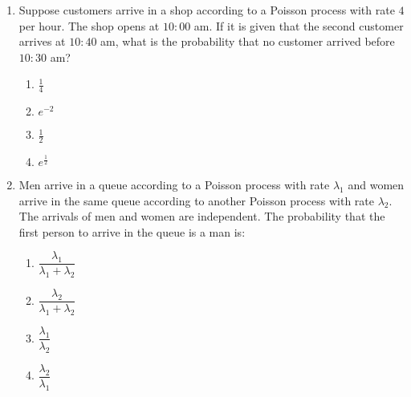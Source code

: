 \begin{enumerate}[label=\thesection.\arabic*.,ref=\thesection.\theenumi]
%
\item Suppose customers arrive in a shop according to a Poisson process with rate $4$ per hour. The shop opens at $10:00$ am. If it is given that the second customer arrives at $10:40 $ am, what is the probability that no customer arrived before $10:30 $ am? 
%
    \begin{enumerate}
        \item $\frac{1}{4}$
        \item $e^{-2}$
        \item $\frac{1}{2}$
        \item $e^{\frac{1}{2}}$
    \end{enumerate}
%
%
\solution

%
\item Men arrive in a queue according to a Poisson process with rate $\lambda_1$ and women arrive in the same queue according to another Poisson process with rate $\lambda_2$. The arrivals of men and women are independent. The probability that the first person to arrive in the queue is a man is:
\begin{enumerate}
\item $\dfrac{\lambda_1}{\lambda_1+\lambda_2}$
\item $\dfrac{\lambda_2}{\lambda_1+\lambda_2}$
\item $\dfrac{\lambda_1}{\lambda_2}$
\item $\dfrac{\lambda_2}{\lambda_1} $
    
\end{enumerate}
%
\solution


\end{enumerate}